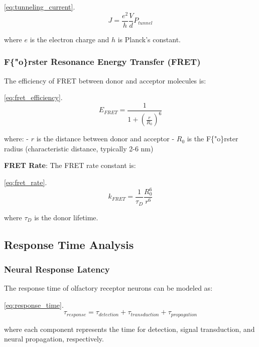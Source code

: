 \documentclass[
  13pt,
  a4paperpaper,
  12pt]{article}
\begin{document}
\eqref{eq:tunneling_current}. \begin{equation}
J = \frac{e^2}{h} \frac{V}{d} P_{tunnel} \label{eq:tunneling_current}
\end{equation}

where \(e\) is the electron charge and \(h\) is Planck's constant.

\subsubsection{F\{"o\}rster Resonance Energy Transfer
(FRET)}\label{forster-resonance-energy-transfer-fret}

The efficiency of FRET between donor and acceptor molecules is:

\eqref{eq:fret_efficiency}. \begin{equation}
E_{FRET} = \frac{1}{1 + \left(\frac{r}{R_0}\right)^6} \label{eq:fret_efficiency}
\end{equation}

where: - \(r\) is the distance between donor and acceptor - \(R_0\) is
the F\{"o\}rster radius (characteristic distance, typically 2-6 nm)

\textbf{FRET Rate}: The FRET rate constant is:

\eqref{eq:fret_rate}. \begin{equation}
k_{FRET} = \frac{1}{\tau_D} \frac{R_0^6}{r^6} \label{eq:fret_rate}
\end{equation}

where \(\tau_D\) is the donor lifetime.

\subsection{Response Time Analysis}\label{response-time-analysis}

\subsubsection{Neural Response Latency}\label{neural-response-latency}

The response time of olfactory receptor neurons can be modeled as:

\eqref{eq:response_time}. \begin{equation}
\tau_{response} = \tau_{detection} + \tau_{transduction} + \tau_{propagation} \label{eq:response_time}
\end{equation}

where each component represents the time for detection, signal
transduction, and neural propagation, respectively.
\end{document}
